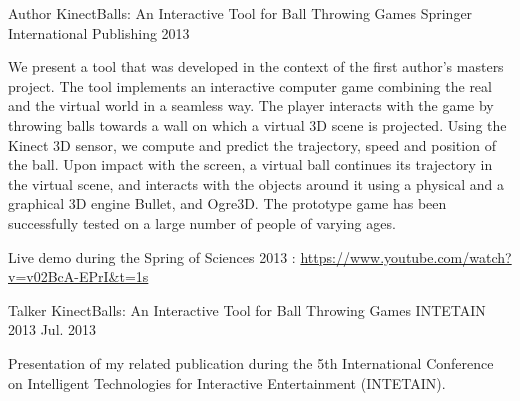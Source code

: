 \begin{cventries}
\cventry
{Author} %
{KinectBalls: An Interactive Tool for Ball Throwing Games} %
{Springer International Publishing} %
{2013} %
{
  \begin{cvitems} %
    \item {We present a tool that was developed in the context of the first author’s masters project. The tool implements an interactive computer game combining the real and the virtual world in a seamless way. The player interacts with the game by throwing balls towards a wall on which a virtual 3D scene is projected. Using the Kinect 3D sensor, we compute and predict the trajectory, speed and position of the ball. Upon impact with the screen, a virtual ball continues its trajectory in the virtual scene, and interacts with the objects around it using a physical and a graphical 3D engine Bullet, and Ogre3D. The prototype game has been successfully tested on a large number of people of varying ages.}
    \item Live demo during the Spring of Sciences 2013 : \url{https://www.youtube.com/watch?v=v02BcA-EPrI&t=1s}
  \end{cvitems}
}
\cventry
{Talker} %
{KinectBalls: An Interactive Tool for Ball Throwing Games} %
{INTETAIN 2013} %
{Jul. 2013} %
{
  \begin{cvitems} %
    \item {Presentation of my related publication during the 5th International Conference on Intelligent Technologies for Interactive Entertainment (INTETAIN).}
  \end{cvitems}
}



\end{cventries}
